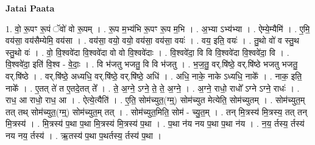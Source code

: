 \documentclass[17pt]{extarticle}
\begin{document}
\textbf{Jatai Paata} \newline

1. वो॒ रू॒पꣳ रू॒पं ॅवो॑ वो रू॒पम् । . रू॒प म॒भ्य॑भि रू॒पꣳ रू॒प म॒भि । . अ॒भ्या ऽभ्य॑भ्या । . ऐम्ये॒म्यैमि॑ । . ए॒मि॒ वय॑सा॒ वय॑सैम्येमि॒ वय॑सा । . वय॑सा॒ वयो॒ वयो॒ वय॑सा॒ वय॑सा॒ वयः॑ । . वय॒ इति॒ वयः॑ । . तु॒थो वो॑ व स्तु॒थ स्तु॒थो वः॑ । . वो॒ वि॒श्ववे॑दा वि॒श्ववे॑दा वो वो वि॒श्ववे॑दाः । . वि॒श्ववे॑दा॒ वि वि वि॒श्ववे॑दा वि॒श्ववे॑दा॒ वि । . वि॒श्ववे॑दा॒ इति॑ वि॒श्व - वे॒दाः॒ । . वि भ॑जतु भजतु॒ वि वि भ॑जतु । . भ॒ज॒तु॒ वर्.षि॑ष्ठे॒ वर्.षि॑ष्ठे भजतु भजतु॒ वर्.षि॑ष्ठे । . वर्.षि॑ष्ठे॒ अध्यधि॒ वर्.षि॑ष्ठे॒ वर्.षि॑ष्ठे॒ अधि॑ । . अधि॒ नाके॒ नाके ऽध्यधि॒ नाके᳚ । . नाक॒ इति॒ नाके᳚ । . ए॒तत् ते॑ त ए॒तदे॒तत् ते᳚ । . ते॒ अ॒ग्ने॒ ऽग्ने॒ ते॒ ते॒ अ॒ग्ने॒ । . अ॒ग्ने॒ राधो॒ राधो᳚ ऽग्ने ऽग्ने॒ राधः॑ । . राध॒ आ राधो॒ राध॒ आ । . ऐत्ये॒त्यैति॑ । . ए॒ति॒ सोम॑च्युत॒(ग्म्॒) सोम॑च्युत मेत्येति॒ सोम॑च्युतम् । . सोम॑च्युत॒म् तत् तथ् सोम॑च्युत॒(ग्म्॒) सोम॑च्युत॒म् तत् । . सोम॑च्युत॒मिति॒ सोम॑ - च्यु॒त॒म् । . तन् मि॒त्रस्य॑ मि॒त्रस्य॒ तत् तन् मि॒त्रस्य॑ । . मि॒त्रस्य॑ प॒था प॒था मि॒त्रस्य॑ मि॒त्रस्य॑ प॒था । . प॒था न॑य नय प॒था प॒था न॑य । . न॒य॒ र्तस्य॒ र्तस्य॑ नय नय॒ र्तस्य॑ । . ऋ॒तस्य॑ प॒था प॒थर्तस्य॒ र्तस्य॑ प॒था । \newline
\end{document}
